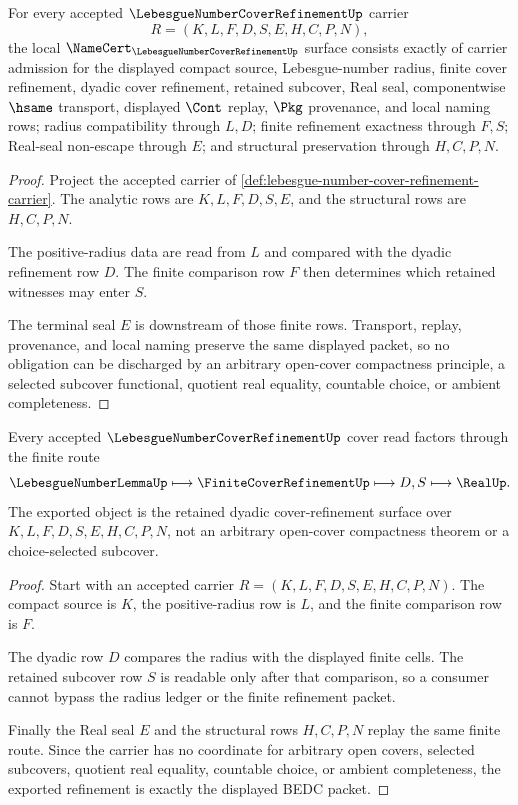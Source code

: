 \begin{theorem}
\label{thm:lebesgue-number-cover-refinement-namecert-obligations}
For every accepted $\LebesgueNumberCoverRefinementUp$ carrier
$$
R=(K,L,F,D,S,E,H,C,P,N),
$$
the local $\NameCert_{\LebesgueNumberCoverRefinementUp}$ surface consists exactly of carrier admission for the displayed compact source, Lebesgue-number radius, finite cover refinement, dyadic cover refinement, retained subcover, Real seal, componentwise $\hsame$ transport, displayed $\Cont$ replay, $\Pkg$ provenance, and local naming rows; radius compatibility through $L,D$; finite refinement exactness through $F,S$; Real-seal non-escape through $E$; and structural preservation through $H,C,P,N$.
\end{theorem}
\begin{proof}
Project the accepted carrier of \autoref{def:lebesgue-number-cover-refinement-carrier}. The analytic rows are $K,L,F,D,S,E$, and the structural rows are $H,C,P,N$.

The positive-radius data are read from $L$ and compared with the dyadic refinement row $D$. The finite comparison row $F$ then determines which retained witnesses may enter $S$.

The terminal seal $E$ is downstream of those finite rows. Transport, replay, provenance, and local naming preserve the same displayed packet, so no obligation can be discharged by an arbitrary open-cover compactness principle, a selected subcover functional, quotient real equality, countable choice, or ambient completeness.
\end{proof}

\begin{theorem}
\label{thm:lebesgue-number-cover-refinement-radius-route}
Every accepted $\LebesgueNumberCoverRefinementUp$ cover read factors through the finite route
$$
\LebesgueNumberLemmaUp \longmapsto \FiniteCoverRefinementUp \longmapsto D,S \longmapsto \RealUp .
$$
The exported object is the retained dyadic cover-refinement surface over $K,L,F,D,S,E,H,C,P,N$, not an arbitrary open-cover compactness theorem or a choice-selected subcover.
\end{theorem}
\begin{proof}
Start with an accepted carrier $R=(K,L,F,D,S,E,H,C,P,N)$. The compact source is $K$, the positive-radius row is $L$, and the finite comparison row is $F$.

The dyadic row $D$ compares the radius with the displayed finite cells. The retained subcover row $S$ is readable only after that comparison, so a consumer cannot bypass the radius ledger or the finite refinement packet.

Finally the Real seal $E$ and the structural rows $H,C,P,N$ replay the same finite route. Since the carrier has no coordinate for arbitrary open covers, selected subcovers, quotient real equality, countable choice, or ambient completeness, the exported refinement is exactly the displayed BEDC packet.
\end{proof}

